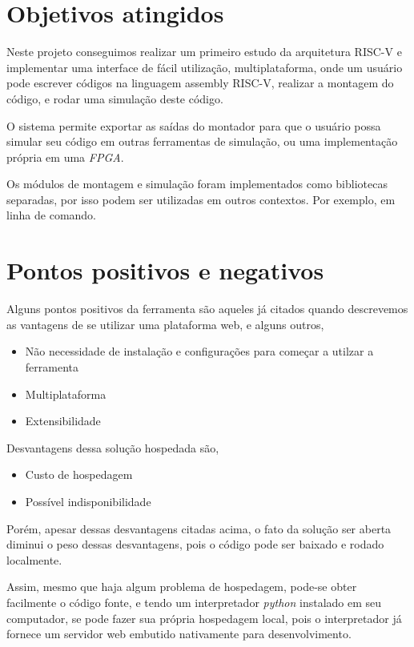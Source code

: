 \section{Objetivos atingidos}

	Neste projeto conseguimos realizar um primeiro estudo da arquitetura RISC-V e implementar uma interface de fácil utilização, multiplataforma, onde um usuário pode escrever códigos na linguagem assembly RISC-V, realizar a montagem do código, e rodar uma simulação deste código.

	O sistema permite exportar as saídas do montador para que o usuário possa simular seu código em outras ferramentas de simulação, ou uma implementação própria em uma \textit{FPGA}.

	Os módulos de montagem e simulação foram implementados como bibliotecas separadas, por isso podem ser utilizadas em outros contextos. Por exemplo, em linha de comando.

\section{Pontos positivos e negativos}

	Alguns pontos positivos da ferramenta são aqueles já citados quando descrevemos as vantagens de se utilizar uma plataforma web, e alguns outros,
	\begin{itemize}
		\item Não necessidade de instalação e configurações para começar a utilzar a ferramenta
		\item Multiplataforma
		\item Extensibilidade
	\end{itemize}

	Desvantagens dessa solução hospedada são,

	\begin{itemize}
		\item Custo de hospedagem
		\item Possível indisponibilidade	
	\end{itemize}

	Porém, apesar dessas desvantagens citadas acima, o fato da solução ser aberta diminui o peso dessas desvantagens, pois o código pode ser baixado e rodado localmente. 

	Assim, mesmo que haja algum problema de hospedagem, pode-se obter facilmente o código fonte, e tendo um interpretador \textit{python} instalado em seu computador, se pode fazer sua própria hospedagem local, pois o interpretador já fornece um servidor web embutido nativamente para desenvolvimento.


